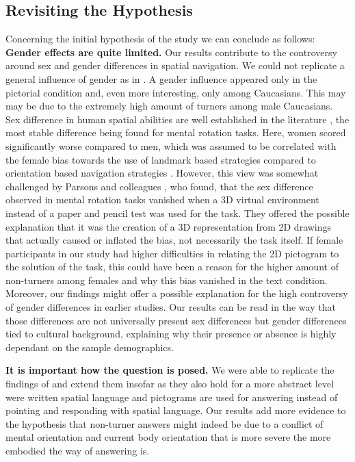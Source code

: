 \documentclass{frontiersSCNS} %
\begin{document}
\subsection{Revisiting the Hypothesis}
Concerning the initial hypothesis of the study we can conclude as follows:
\\
\textbf{Gender effects are quite limited.}
Our results contribute to the controversy around sex and gender differences in spatial navigation. We could not replicate a general influence of gender as in \citep{Goeke2013}. A gender influence appeared only in the pictorial condition and, even more interesting, only among Caucasians. This may may be due to the extremely high amount of turners among male Caucasians.\\
Sex difference in human spatial abilities are well established in the literature \citep{Linn1985,Voyer1995}, the most stable difference being found for mental rotation tasks. Here, women scored significantly worse compared to men, which was assumed to be correlated with the female bias towards the use of landmark based strategies compared to orientation based navigation strategies \citep{Moffat1998,Dabbs1998,Astur1998}. However, this view was somewhat challenged by Parsons and colleagues \citep{Parsons2004}, who found, that the sex difference observed in mental rotation tasks vanished when a 3D virtual environment instead of a paper and pencil test was used for the task. They offered the possible explanation that it was the creation of a 3D representation from 2D drawings that actually caused or inflated the bias, not necessarily the task itself. If female participants in our study had higher difficulties in relating the 2D pictogram to the solution of the task, this could have been a reason for the higher amount of non-turners among females and why this bias vanished in the text condition. \\
Moreover, our findings might offer a possible explanation for the high controversy of gender differences in earlier studies. Our results can be read in the way that those differences are not universally present sex differences but gender differences tied to cultural background, explaining why their presence or absence is highly dependant on the sample demographics.

\textbf{It is important how the question is posed.}
We were able to replicate the findings of \citep{Avraamides2004} and extend them insofar as they also hold for a more abstract level were written spatial language and pictograms are used for answering instead of pointing and responding with spatial language. Our results add more evidence to the hypothesis that non-turner answers might indeed be due to a conflict of mental orientation and current body orientation that is more severe the more embodied the way of answering is.
\end{document}
